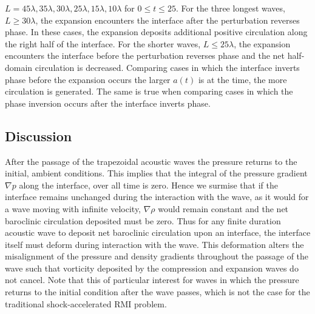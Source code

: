 $L=45\lambda, 35\lambda ,30\lambda ,25\lambda ,15\lambda ,10\lambda$
for $0 \leq t\leq 25$.  For the three longest waves,
$L \geq 30\lambda$, the expansion encounters the interface after the
perturbation reverses phase. In these cases, the expansion deposits
additional positive circulation along the right half of the
interface. For the shorter waves, $L \leq 25\lambda$, the expansion
encounters the interface before the perturbation reverses phase and
the net half-domain circulation is decreased. Comparing cases in
which the interface inverts phase before the expansion occurs the
larger $a(t)$ is at the time, the more circulation is generated. The
same is true when comparing cases in which the phase inversion
occurs after the interface inverts phase.
% 
% 
\subsection{Discussion}
\label{subsec:discussion}
After the passage of the trapezoidal acoustic waves the pressure
returns to the initial, ambient conditions. This implies that the
integral of the pressure gradient $\nabla p$ along the interface,
over all time is zero. Hence we surmise that if the interface
remains unchanged during the interaction with the wave, as it would
for a wave moving with infinite velocity, $\nabla \rho$ would remain
constant and the net baroclinic circulation deposited must be
zero. Thus for any finite duration acoustic wave to deposit net
baroclinic circulation upon an interface, the interface itself must
deform during interaction with the wave. This deformation alters the
misalignment of the pressure and density gradients throughout the
passage of the wave such that vorticity deposited by the compression
and expansion waves do not cancel. Note that this of particular
interest for waves in which the pressure returns to the initial
condition after the wave passes, which is not the case for the
traditional shock-accelerated \ac{RMI} problem.

